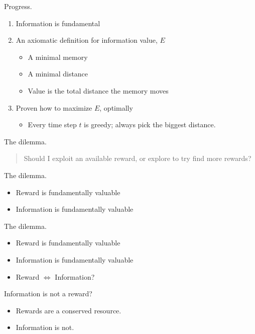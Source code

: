 \documentclass[10pt]{beamer}
\begin{document}
\begin{frame}[fragile]{Progress.}
\begin{enumerate}
\item Information is fundamental
\item An axiomatic definition for information value, $E$
\begin{itemize}
\item A minimal memory
\item A minimal distance
\item Value is the total distance the memory moves
\end{itemize}
\item Proven how to maximize $E$, optimally
\begin{itemize}
\item Every time step $t$ is greedy; always pick the biggest distance.
\end{itemize}
\end{enumerate}
\end{frame}

\begin{frame}[fragile]{The dilemma.}
    \begin{quote}
        Should I exploit an available reward, or explore to try find more rewards? 
    \end{quote}
\end{frame}

\begin{frame}[fragile]{The dilemma.}
\begin{itemize}
    \item Reward is fundamentally valuable
    \item Information is fundamentally valuable
\end{itemize}
\end{frame}

\begin{frame}[fragile]{The dilemma.}
\begin{itemize}
    \item Reward is fundamentally valuable
    \item Information is fundamentally valuable
    \item Reward $\Leftrightarrow$ Information?
\end{itemize}
\end{frame}

\begin{frame}[fragile]{Information is not a reward?}
\begin{itemize}
    \item Rewards are a conserved resource.
    \item Information is not.
\end{itemize}
\end{frame}
\end{document}
